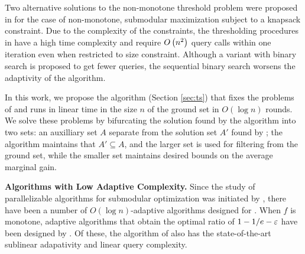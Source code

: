 Two alternative solutions to the non-monotone threshold problem were proposed 
in  for the case of non-monotone,
submodular maximization subject to a knapsack constraint.
Due to the complexity of the constraints, the thresholding procedures
in  have a high time complexity and
require
$O\left( n^2 \right)$ query calls within one iteration
even when restricted to size constraint.
Although a variant with binary search is proposed to get 
fewer queries, the sequential binary search worsens
the adaptivity of the algorithm.

In this work, we propose the
\threseq algorithm (Section \ref{sec:ts})
that fixes the problems of \thresam and runs
in linear time in the size $n$ of the ground
set in $O( \log n )$ rounds. We solve these problems
by bifurcating the solution found by the algorithm
into two sets: an auxilliary set $A$ separate from the solution
set $A'$ found by \threseq; the algorithm maintains that
$A' \subseteq A$, and the larger set is used for filtering
from the ground set, while the smaller set maintains desired
bounds on the average marginal gain. 

\textbf{Algorithms with Low Adaptive Complexity.}
Since the study of parallelizable algorithms for
submodular optimization was initiated by
, there have been a
number of $O(\log n)$-adaptive algorithms designed
for \sm. When $f$ is monotone, adaptive algorithms
that obtain the optimal ratio \cite{Nemhauser1978a} of $1 - 1/e - \varepsilon$
have been designed by .
Of these, the algorithm of  also has
the state-of-the-art
sublinear adapativity and linear query complexity.

